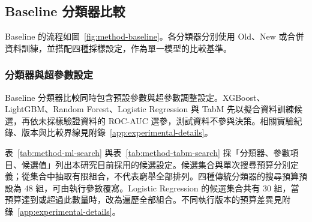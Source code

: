 \subsection{Baseline 分類器比較}\label{sec:method-phase1}

Baseline 的流程如圖~\ref{fig:method-baseline}。各分類器分別使用 Old、New 或合併資料訓練，並搭配四種採樣設定，作為單一模型的比較基準。
\subsubsection{分類器與超參數設定}\label{sec:method-phase1-params}

Baseline 分類器比較同時包含預設參數與超參數調整設定。XGBoost、LightGBM、Random Forest、Logistic Regression 與 TabM 先以擬合資料訓練候選，再依未採樣驗證資料的 ROC-AUC 選參，測試資料不參與決策。相關實驗紀錄、版本與比較界線見附錄~\ref{app:experimental-details}。

表~\ref{tab:method-ml-search} 與表~\ref{tab:method-tabm-search} 採「分類器、參數項目、候選值」列出本研究目前採用的候選設定。候選集合與單次搜尋預算分別定義；從集合中抽取有限組合，不代表窮舉全部排列。四種傳統分類器的搜尋預算預設為 48 組，可由執行參數覆寫。Logistic Regression 的候選集合共有 30 組，當預算達到或超過此數量時，改為遍歷全部組合。不同執行版本的預算差異見附錄~\ref{app:experimental-details}。

